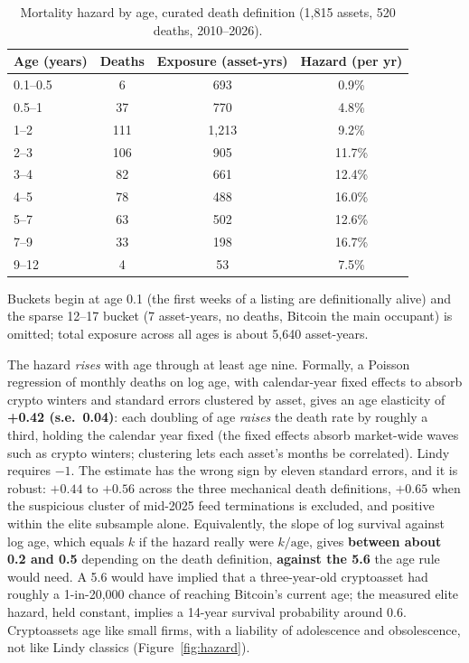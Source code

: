 \documentclass[11pt]{article}
\begin{document}
\begin{table}[ht]\centering\small
\caption{Mortality hazard by age, curated death definition (1,815 assets, 520 deaths, 2010--2026).}
\label{tab:hazard}
\begin{tabular}{lccc}
\toprule
Age (years) & Deaths & Exposure (asset-yrs) & Hazard (per yr) \\
\midrule
0.1--0.5 & 6 & 693 & 0.9\% \\
0.5--1 & 37 & 770 & 4.8\% \\
1--2 & 111 & 1{,}213 & 9.2\% \\
2--3 & 106 & 905 & 11.7\% \\
3--4 & 82 & 661 & 12.4\% \\
4--5 & 78 & 488 & 16.0\% \\
5--7 & 63 & 502 & 12.6\% \\
7--9 & 33 & 198 & 16.7\% \\
9--12 & 4 & 53 & 7.5\% \\
\bottomrule
\end{tabular}
\par\smallskip\parbox{0.8\textwidth}{\footnotesize Buckets begin at age 0.1 (the first weeks of a listing are definitionally alive) and the sparse 12--17 bucket (7 asset-years, no deaths, Bitcoin the main occupant) is omitted; total exposure across all ages is about 5,640 asset-years.}
\end{table}

The hazard \emph{rises} with age through at least age nine. Formally, a Poisson regression of monthly deaths on log age, with calendar-year fixed effects to absorb crypto winters and standard errors clustered by asset, gives an age elasticity of \textbf{+0.42 (s.e.\ 0.04)}: each doubling of age \emph{raises} the death rate by roughly a third, holding the calendar year fixed (the fixed effects absorb market-wide waves such as crypto winters; clustering lets each asset's months be correlated). Lindy requires $-1$. The estimate has the wrong sign by eleven standard errors, and it is robust: $+0.44$ to $+0.56$ across the three mechanical death definitions, $+0.65$ when the suspicious cluster of mid-2025 feed terminations is excluded, and positive within the elite subsample alone. Equivalently, the slope of log survival against log age, which equals $k$ if the hazard really were $k/\text{age}$, gives \textbf{between about 0.2 and 0.5} depending on the death definition, \textbf{against the 5.6} the age rule would need. A 5.6 would have implied that a three-year-old cryptoasset had roughly a 1-in-20,000 chance of reaching Bitcoin's current age; the measured elite hazard, held constant, implies a 14-year survival probability around 0.6. Cryptoassets age like small firms, with a liability of adolescence and obsolescence, not like Lindy classics (Figure~\ref{fig:hazard}).
\end{document}

